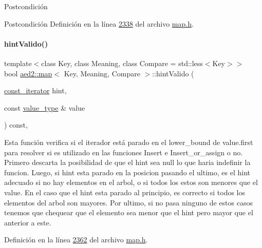 \begin{DoxyPostcond}{\-Postcondición}
\begin{DoxyPostcond}{\-Postcondición}
Definición en la línea \hyperlink{map_8h_source_l02338}{2338} del archivo \hyperlink{map_8h_source}{map.\+h}.

\mbox{\label{classaed2_1_1map_a0039f50bdf2b4e5836a1ad437ecb2202_a0039f50bdf2b4e5836a1ad437ecb2202}} 
\paragraph{\texorpdfstring{hint\+Valido()}{hintValido()}}
{\footnotesize\ttfamily template$<$class Key, class Meaning, class Compare = std\+::less$<$\+Key$>$$>$ \\
bool \hyperlink{classaed2_1_1map}{aed2\+::map}$<$ Key, Meaning, Compare $>$\+::hint\+Valido (\begin{DoxyParamCaption}\item[{\hyperlink{classaed2_1_1map_1_1const__iterator}{const\+\_\+iterator}}]{hint,  }\item[{const \hyperlink{classaed2_1_1map_a719db98e0ff9a837610f76be33264680_a719db98e0ff9a837610f76be33264680}{value\+\_\+type} \&}]{value }\end{DoxyParamCaption}) const\hspace{0.3cm}{\ttfamily [inline]}, {\ttfamily [private]}}

Esta función verifica si el iterador está parado en el lower\+\_\+bound de value.\+first para resolver si es utilizado en las funciones Insert e Insert\+\_\+or\+\_\+assign o no. Primero descarta la posibilidad de que el hint sea null lo que haria indefinir la funcion. Luego, si hint esta parado en la posicion pasando el ultimo, es el hint adecuado si no hay elementos en el arbol, o si todos los estos son menores que el value. En el caso que el hint esta parado al principio, es correcto si todos los elementos del arbol son mayores. Por ultimo, si no pasa ninguno de estos casos tenemos que chequear que el elemento sea menor que el hint pero mayor que el anterior a este. 

Definición en la línea \hyperlink{map_8h_source_l02362}{2362} del archivo \hyperlink{map_8h_source}{map.\+h}.

\mbox{\label{classaed2_1_1map_a4b4f1e65ee9aeccee4046d53fd5fd8a4_a4b4f1e65ee9aeccee4046d53fd5fd8a4}} 

\end{DoxyPostcond}
\end{DoxyPostcond}
